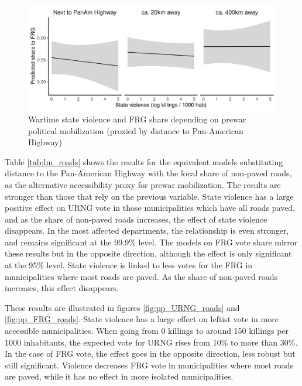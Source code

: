 \documentclass[12pt, notitlepage]{article}
\begin{document}
\begin{figure}[htb!]
  \centering
    \includegraphics[width = .75\textwidth]{img/pp_FRG_panam}

  \caption{Wartime state violence and FRG share depending on prewar political mobilization (proxied by distance to Pan-American Highway)} \label{fig:pp_FRG_panam}


\end{figure}

Table \ref{tab:lm_roads} shows the results for the equivalent models substituting distance to the Pan-American Highway with the local share of non-paved roads, as the alternative accessibility proxy for prewar mobilization.
The results are stronger than those that rely on the previous variable.
State violence has a large positive effect on URNG vote in those municipalities which have all roads paved, and as the share of non-paved roads increases, the effect of state violence disappears.
In the most affected departments, the relationship is even stronger, and remains significant at the 99.9\% level.
The models on FRG vote share mirror these results but in the opposite direction, although the effect is only significant at the 95\% level.
State violence is linked to less votes for the FRG in municipalities where most roads are paved. As the share of non-paved roads increases, this effect disappears.



These results are illustrated in figures \ref{fig:pp_URNG_roads} and \ref{fig:pp_FRG_roads}.
State violence has a large effect on leftist vote in more accessible municipalities.
When going from 0 killings to around 150 killings per 1000 inhabitants, the expected vote for URNG rises from 10\% to more than 30\%.
In the case of FRG vote, the effect goes in the opposite direction, less robust but still significant.
Violence decreases FRG vote in municipalities where most roads are paved, while it has no effect in more isolated municipalities.
\end{document}
